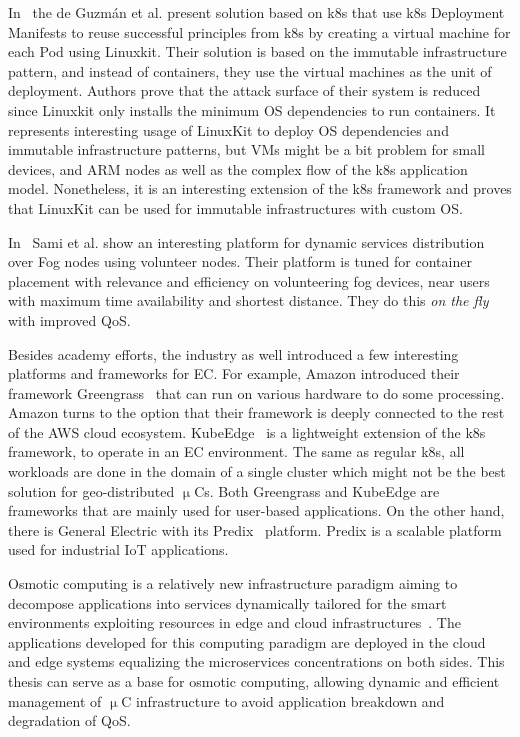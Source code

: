 In~\cite{abs-1802-10375} the de Guzm{\'{a}}n et al. present solution based on k8s that use k8s Deployment Manifests to reuse successful principles from k8s by creating a virtual machine for each Pod using Linuxkit. Their solution is based on the immutable infrastructure pattern, and instead of containers, they use the virtual machines as the unit of deployment. Authors prove that the attack surface of their system is reduced since Linuxkit only installs the minimum OS dependencies to run containers. It represents interesting usage of LinuxKit to deploy OS dependencies and immutable infrastructure patterns, but VMs might be a bit problem for small devices, and ARM nodes as well as the complex flow of the k8s application model. Nonetheless, it is an interesting extension of the k8s framework and proves that LinuxKit can be used for immutable infrastructures with custom OS.

In~\cite{SamiM20} Sami et al. show an interesting platform for dynamic services distribution over Fog nodes using volunteer nodes. Their platform is tuned for container placement with relevance and efficiency on volunteering fog devices, near users with maximum time availability and shortest distance. They do this \textit{on the fly}  with improved QoS.

Besides academy efforts, the industry as well introduced a few interesting platforms and frameworks for EC. For example, Amazon introduced their framework Greengrass~\cite{kurniawan_2018} that can run on various hardware to do some processing. Amazon turns to the option that their framework is deeply connected to the rest of the AWS cloud ecosystem.  KubeEdge~\cite{KubeEdge} is a lightweight extension of the k8s framework, to operate in an EC environment. The same as regular k8s, all workloads are done in the domain of a single cluster which might not be the best solution for geo-distributed $\upmu$Cs. Both Greengrass and KubeEdge are frameworks that are mainly used for user-based applications. On the other hand, there is General Electric with its Predix~\cite{GE_Predix} platform. Predix is a scalable platform used for industrial IoT applications.

Osmotic computing is a relatively new infrastructure paradigm aiming to decompose applications into services dynamically tailored for the smart environments exploiting resources in edge and cloud infrastructures~\cite{VillariFDRJR19}. The applications developed for this computing paradigm are deployed in the cloud and edge systems equalizing the microservices concentrations on both sides. This thesis can serve as a base for osmotic computing, allowing dynamic and efficient management of $\upmu$C infrastructure to avoid application breakdown and degradation of QoS.
%
%
